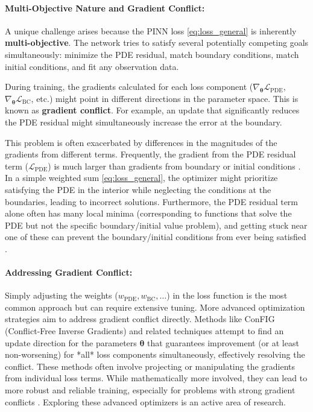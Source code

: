 \paragraph{Multi-Objective Nature and Gradient Conflict:}
A unique challenge arises because the PINN loss \eqref{eq:loss_general} is inherently \textbf{multi-objective}. The network tries to satisfy several potentially competing goals simultaneously: minimize the PDE residual, match boundary conditions, match initial conditions, and fit any observation data.

During training, the gradients calculated for each loss component ($\nabla_{\boldsymbol{\theta}}\mathcal{L}_{\text{PDE}}$, $\nabla_{\boldsymbol{\theta}}\mathcal{L}_{\text{BC}}$, etc.) might point in different directions in the parameter space. This is known as \textbf{gradient conflict}. For example, an update that significantly reduces the PDE residual might simultaneously increase the error at the boundary.

This problem is often exacerbated by differences in the magnitudes of the gradients from different terms. Frequently, the gradient from the PDE residual term ($\mathcal{L}_{\text{PDE}}$) is much larger than gradients from boundary or initial conditions \cite{wang2021understanding}. In a simple weighted sum \eqref{eq:loss_general}, the optimizer might prioritize satisfying the PDE in the interior while neglecting the conditions at the boundaries, leading to incorrect solutions. Furthermore, the PDE residual term alone often has many local minima (corresponding to functions that solve the PDE but not the specific boundary/initial value problem), and getting stuck near one of these can prevent the boundary/initial conditions from ever being satisfied \cite{liu2024config}.

\paragraph{Addressing Gradient Conflict:}
Simply adjusting the weights ($w_{\text{PDE}}, w_{\text{BC}}, \dots$) in the loss function is the most common approach but can require extensive tuning. More advanced optimization strategies aim to address gradient conflict directly. Methods like ConFIG (Conflict-Free Inverse Gradients) \cite{liu2024config} and related techniques \cite{yu2020gradient} attempt to find an update direction for the parameters $\boldsymbol{\theta}$ that guarantees improvement (or at least non-worsening) for *all* loss components simultaneously, effectively resolving the conflict. These methods often involve projecting or manipulating the gradients from individual loss terms. While mathematically more involved, they can lead to more robust and reliable training, especially for problems with strong gradient conflicts \cite{liu2024config}. Exploring these advanced optimizers is an active area of research.

